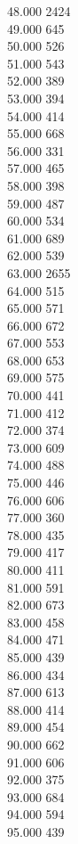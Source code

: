 { 48.000	2424 \\
 49.000	645 \\
 50.000	526 \\
 51.000	543 \\
 52.000	389 \\
 53.000	394 \\
 54.000	414 \\
 55.000	668 \\
 56.000	331 \\
 57.000	465 \\
 58.000	398 \\
 59.000	487 \\
 60.000	534 \\
 61.000	689 \\
 62.000	539 \\
 63.000	2655 \\
 64.000	515 \\
 65.000	571 \\
 66.000	672 \\
 67.000	553 \\
 68.000	653 \\
 69.000	575 \\
 70.000	441 \\
 71.000	412 \\
 72.000	374 \\
 73.000	609 \\
 74.000	488 \\
 75.000	446 \\
 76.000	606 \\
 77.000	360 \\
 78.000	435 \\
 79.000	417 \\
 80.000	411 \\
 81.000	591 \\
 82.000	673 \\
 83.000	458 \\
 84.000	471 \\
 85.000	439 \\
 86.000	434 \\
 87.000	613 \\
 88.000	414 \\
 89.000	454 \\
 90.000	662 \\
 91.000	606 \\
 92.000	375 \\
 93.000	684 \\
 94.000	594 \\
 95.000	439 \\
}
